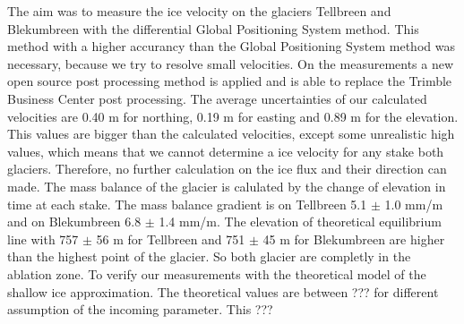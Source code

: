 The aim was to measure the ice velocity on the glaciers Tellbreen and Blekumbreen  with the differential Global Positioning System method. 
This method with a higher accurancy than the Global Positioning System method was necessary, because we try to resolve small velocities.
On the measurements a new open source post processing method is applied and is able to replace the Trimble Business Center post processing.
The average uncertainties of our calculated velocities are 0.40 m for northing, 0.19 m for easting and 0.89 m for the elevation.
This values are bigger than the calculated velocities, except some unrealistic high values, which means that we cannot determine a ice velocity for any stake both glaciers.
Therefore, no further calculation on the ice flux and their direction can made.
The mass balance of the glacier is calulated by the change of elevation in time at each stake. 
The mass balance gradient is on Tellbreen 5.1 $\pm$ 1.0 mm/m and on Blekumbreen 6.8 $\pm$ 1.4 mm/m. The elevation of theoretical equilibrium line with 757 $\pm$ 56 m for Tellbreen and 751 $\pm$ 45 m for Blekumbreen are higher than the highest point of the glacier. 
So both glacier are completly in the ablation zone.
To verify our measurements with the theoretical model of the shallow ice approximation.
The theoretical values are between ??? for different assumption of the incoming parameter.
This ???